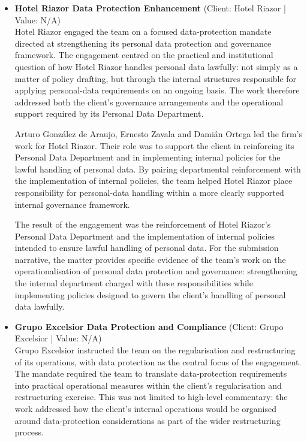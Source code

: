 \documentclass[11pt]{article}
\begin{document}
\begin{itemize}
The stated result was the strengthening of Biocodex’s internal controls and a reduction in regulatory exposure. This matter provides concrete evidence of the team’s ability to translate personal data protection requirements into institutional arrangements within a client organisation: designing and implementing a structured personal data protection framework while helping establish a dedicated Personal Data Protection Department to support stronger internal controls and reduced regulatory exposure.
\item \textbf{Hotel Riazor Data Protection Enhancement} (Client: Hotel Riazor | Value: N/A)\\ Hotel Riazor engaged the team on a focused data-protection mandate directed at strengthening its personal data protection and governance framework. The engagement centred on the practical and institutional question of how Hotel Riazor handles personal data lawfully: not simply as a matter of policy drafting, but through the internal structures responsible for applying personal-data requirements on an ongoing basis. The work therefore addressed both the client’s governance arrangements and the operational support required by its Personal Data Department.

Arturo González de Araujo, Ernesto Zavala and Damián Ortega led the firm’s work for Hotel Riazor. Their role was to support the client in reinforcing its Personal Data Department and in implementing internal policies for the lawful handling of personal data. By pairing departmental reinforcement with the implementation of internal policies, the team helped Hotel Riazor place responsibility for personal-data handling within a more clearly supported internal governance framework.

The result of the engagement was the reinforcement of Hotel Riazor’s Personal Data Department and the implementation of internal policies intended to ensure lawful handling of personal data. For the submission narrative, the matter provides specific evidence of the team’s work on the operationalisation of personal data protection and governance: strengthening the internal department charged with these responsibilities while implementing policies designed to govern the client’s handling of personal data lawfully.
\item \textbf{Grupo Excelsior Data Protection and Compliance} (Client: Grupo Excelsior | Value: N/A)\\ Grupo Excelsior instructed the team on the regularisation and restructuring of its operations, with data protection as the central focus of the engagement. The mandate required the team to translate data-protection requirements into practical operational measures within the client’s regularisation and restructuring exercise. This was not limited to high-level commentary: the work addressed how the client’s internal operations would be organised around data-protection considerations as part of the wider restructuring process.


\end{itemize}
\end{document}
